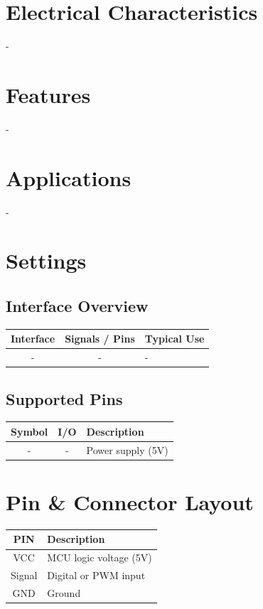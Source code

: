 \documentclass[10pt]{article}
\begin{document}
\section*{Electrical Characteristics}
-\\ 

\section*{Features}
-\\ 



\section*{Applications}
-\\ 

\vspace{1em}



\section*{Settings}

\subsection*{Interface Overview}
\begin{tabularx}{\textwidth}{|c|c|>{\RaggedRight\arraybackslash}X|}
\hline
\rowcolor{headergray}
Interface & Signals / Pins & Typical Use \\
\hline
- & - & - \\
\hline
\end{tabularx}


\subsection*{Supported Pins}
\begin{tabularx}{\textwidth}{|c|c|>{\RaggedRight\arraybackslash}X|}
\hline
\rowcolor{headergray}
Symbol & I/O & Description \\
\hline
- & - & Power supply (5V) \\
\hline
\end{tabularx}




\section*{Pin \& Connector Layout}
\begin{tabularx}{\textwidth}{|c|>{\RaggedRight\arraybackslash}X|}
\hline
\rowcolor{headergray}
PIN & Description \\
\hline
VCC & MCU logic voltage (5V) \\
Signal & Digital or PWM input \\
GND & Ground \\
\hline
\end{tabularx}
\end{document}
